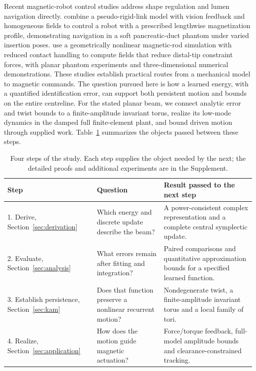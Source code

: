 Recent magnetic-robot control studies address shape regulation and lumen navigation directly. \citet{francescon2025shape} combine a pseudo-rigid-link model with vision feedback and homogeneous fields to control a robot with a prescribed lengthwise magnetization profile, demonstrating navigation in a soft pancreatic-duct phantom under varied insertion poses. \citet{tong2025navigation} use a geometrically nonlinear magnetic-rod simulation with reduced contact handling to compute fields that reduce distal-tip constraint forces, with planar phantom experiments and three-dimensional numerical demonstrations. These studies establish practical routes from a mechanical model to magnetic commands. The question pursued here is how a learned energy, with a quantified identification error, can support both persistent motion and bounds on the entire centreline. For the stated planar beam, we connect analytic error and twist bounds to a finite-amplitude invariant torus, realize its low-mode dynamics in the damped full finite-element plant, and bound driven motion through supplied work. Table~\ref{tab:core-roadmap} summarizes the objects passed between these steps.

\begin{table}[t]
\centering
\caption{Four steps of the study. Each step supplies the object needed by the next; the detailed proofs and additional experiments are in the Supplement.}
\label{tab:core-roadmap}
\begin{tabular}{p{}p{}p{}}
\toprule
Step & Question & Result passed to the next step\\
\midrule
1. Derive, Section~\ref{sec:derivation} & Which energy and discrete update describe the beam? & A power-consistent complex representation and a complete central symplectic update.\\
2. Evaluate, Section~\ref{sec:analysis} & What errors remain after fitting and integration? & Paired comparisons and quantitative approximation bounds for a specified learned function.\\
3. Establish persistence, Section~\ref{sec:kam} & Does that function preserve a nonlinear recurrent motion? & Nondegenerate twist, a finite-amplitude invariant torus and a local family of tori.\\
4. Realize, Section~\ref{sec:application} & How does the motion guide magnetic actuation? & Force/torque feedback, full-model amplitude bounds and clearance-constrained tracking.\\
\bottomrule
\end{tabular}
\end{table}

